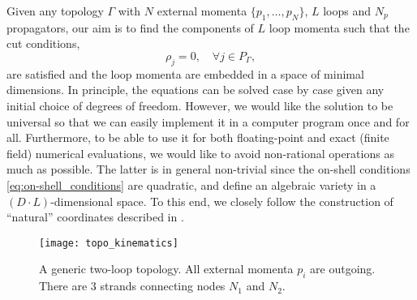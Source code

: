 Given any topology $\Gamma$ with $N$ external momenta $\{p_1,\ldots{},p_N\}$, $L$ loops and $N_p$ propagators, our aim
is to find the components of $L$ loop momenta such that  
the cut conditions,
\begin{equation} \label{eq:on-shell_conditions}
  \rho_j = 0, \quad \forall j\in P_\Gamma,
\end{equation}
are satisfied and the loop momenta are embedded in a space of minimal dimensions.
In principle, the equations can be solved case by case given any initial choice of degrees of freedom.
However, we would like the solution to be universal so that we can easily
implement it in a computer program once and for all. 
Furthermore, to be able to use it for both floating-point and exact (finite field) numerical evaluations, 
we would like to avoid non-rational operations as much as possible.
The latter is in general non-trivial since the on-shell conditions \eqref{eq:on-shell_conditions} are quadratic, and
define an algebraic variety in a $(D\cdot L)$-dimensional space.
To this end, we closely follow the construction of ``natural'' coordinates described in \cite{Ita:2015tya, Abreu:2017xsl, Abreu:2017hqn}.

\begin{figure}[ht]
  \centering
  \texttt{[image: topo\_kinematics]}
  \caption{A generic two-loop topology. All external momenta $p_i$ are outgoing. There are 3 strands connecting nodes $N_1$ and $N_2$.}
  \label{fig:topo_kinematics}
\end{figure}

